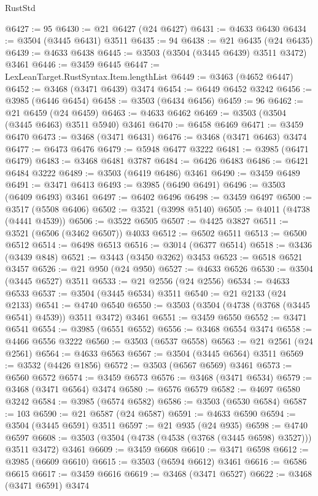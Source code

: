 \begin{lexlean}{RustStd}
\begin{coremodule}
@6427 := 95
@6430 := @21 @6427 (@24 @6427)
@6431 := @4633 @6430
@6434 := @3504 (@3445 @6431) @3511
@6435 := 94
@6438 := @21 @6435 (@24 @6435)
@6439 := @4633 @6438
@6445 := @3503 (@3504 (@3445 @6439) @3511 @3472) @3461
@6446 := @3459 @6445
@6447 := LexLeanTarget.RustSyntax.Item.lengthList
@6449 := @3463 (@4652 @6447)
@6452 := @3468 (@3471 @6439) @3474
@6454 := @6449 @6452 @3242
@6456 := @3985 (@6446 @6454)
@6458 := @3503 (@6434 @6456)
@6459 := 96
@6462 := @21 @6459 (@24 @6459)
@6463 := @4633 @6462
@6469 := @3503 (@3504 (@3445 @6463) @3511 @5940) @3461
@6470 := @6458 @6469
@6471 := @3459 @6470
@6473 := @3468 (@3471 @6431)
@6476 := @3468 (@3471 @6463) @3474
@6477 := @6473 @6476
@6479 := @5948 @6477 @3222
@6481 := @3985 (@6471 @6479)
@6483 := @3468 @6481 @3787
@6484 := @6426 @6483
@6486 := @6421 @6484 @3222
@6489 := @3503 (@6419 @6486) @3461
@6490 := @3459 @6489
@6491 := @3471 @6413
@6493 := @3985 (@6490 @6491)
@6496 := @3503 (@6409 @6493) @3461
@6497 := @6402 @6496
@6498 := @3459 @6497
@6500 := @3517 (@5508 @6406)
@6502 := @3521 (@3998 @5140)
@6505 := @4011 (@4738 (@4441 @4539))
@6506 := @3522 @6505
@6507 := @4425 @3827
@6511 := @3521 (@6506 (@3462 @6507)) @4033
@6512 := @6502 @6511
@6513 := @6500 @6512
@6514 := @6498 @6513
@6516 := @3014 (@6377 @6514)
@6518 := @3436 (@3439 @848)
@6521 := @3443 (@3450 @3262) @3453
@6523 := @6518 @6521 @3457
@6526 := @21 @950 (@24 @950)
@6527 := @4633 @6526
@6530 := @3504 (@3445 @6527) @3511
@6533 := @21 @2556 (@24 @2556)
@6534 := @4633 @6533
@6537 := @3504 (@3445 @6534) @3511
@6540 := @21 @2133 (@24 @2133)
@6541 := @4740 @6540
@6550 := @3503 (@3504 (@4738 (@3768 (@3445 @6541) @4539)) @3511 @3472) @3461
@6551 := @3459 @6550
@6552 := @3471 @6541
@6554 := @3985 (@6551 @6552)
@6556 := @3468 @6554 @3474
@6558 := @4466 @6556 @3222
@6560 := @3503 (@6537 @6558)
@6563 := @21 @2561 (@24 @2561)
@6564 := @4633 @6563
@6567 := @3504 (@3445 @6564) @3511
@6569 := @3532 (@4426 @1856)
@6572 := @3503 (@6567 @6569) @3461
@6573 := @6560 @6572
@6574 := @3459 @6573
@6576 := @3468 (@3471 @6534)
@6579 := @3468 (@3471 @6564) @3474
@6580 := @6576 @6579
@6582 := @4697 @6580 @3242
@6584 := @3985 (@6574 @6582)
@6586 := @3503 (@6530 @6584)
@6587 := 103
@6590 := @21 @6587 (@24 @6587)
@6591 := @4633 @6590
@6594 := @3504 (@3445 @6591) @3511
@6597 := @21 @935 (@24 @935)
@6598 := @4740 @6597
@6608 := @3503 (@3504 (@4738 (@4538 (@3768 (@3445 @6598) @3527))) @3511 @3472) @3461
@6609 := @3459 @6608
@6610 := @3471 @6598
@6612 := @3985 (@6609 @6610)
@6615 := @3503 (@6594 @6612) @3461
@6616 := @6586 @6615
@6617 := @3459 @6616
@6619 := @3468 (@3471 @6527)
@6622 := @3468 (@3471 @6591) @3474

\end{coremodule}
\end{lexlean}
